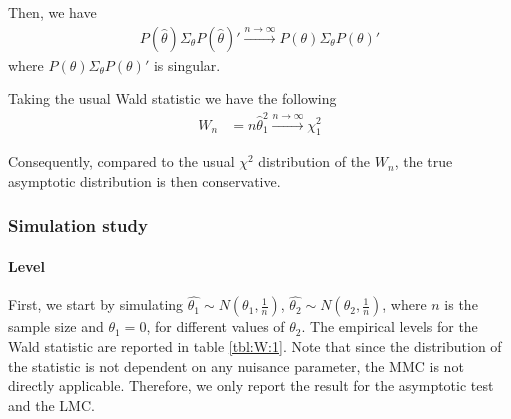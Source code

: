 \documentclass[11pt]{article}\usepackage[]{graphicx}\usepackage[]{color}
\begin{document}
Then, we have
\begin{align}
	P(\hat{\theta})\Sigma_\theta P(\hat{\theta})'\xrightarrow{n \rightarrow \infty} P(\theta)\Sigma_\theta P(\theta)'
\end{align}
where $P(\theta)\Sigma_\theta P(\theta)'$ is singular.


Taking the usual Wald statistic we have the following
\begin{align}
	W_n & = n \hat{\theta}_1^2 \xrightarrow{n \rightarrow \infty} \chi^2_1
\end{align}

Consequently, compared to the usual $\chi^2$ distribution of the $W_n$, the true asymptotic distribution is then conservative.

\subsubsection{Simulation study}
\paragraph{Level}

First, we start by simulating $\hat{\theta_1} \sim N(\theta_1,\frac{1}{n})$, $\hat{\theta_2} \sim N(\theta_2,\frac{1}{n})$, where $n$ is the sample size and $\theta_1=0$, for different values of $\theta_2$. The empirical levels for the Wald statistic are reported in table \ref{tbl:W:1}. Note that since the distribution of the statistic is not dependent on any nuisance parameter, the MMC is not directly applicable. Therefore, we only report the result for the asymptotic test and the LMC.
\end{document}
